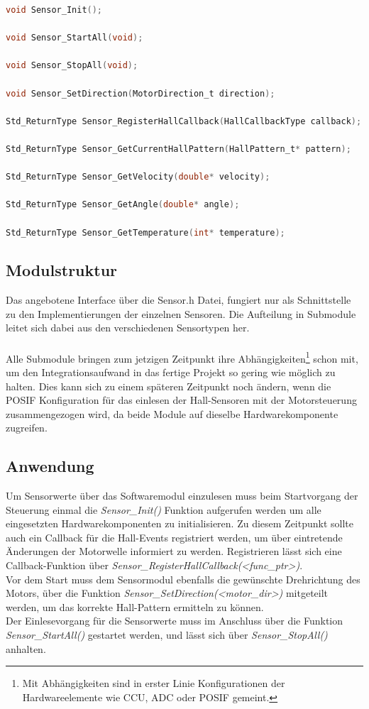 \begin{lstlisting}[frame=single, language=c, caption=Sensor Interface, label=lst:SensorInterface]
void Sensor_Init();

void Sensor_StartAll(void);

void Sensor_StopAll(void);

void Sensor_SetDirection(MotorDirection_t direction);

Std_ReturnType Sensor_RegisterHallCallback(HallCallbackType callback);

Std_ReturnType Sensor_GetCurrentHallPattern(HallPattern_t* pattern);

Std_ReturnType Sensor_GetVelocity(double* velocity);

Std_ReturnType Sensor_GetAngle(double* angle);

Std_ReturnType Sensor_GetTemperature(int* temperature);
\end{lstlisting}

\subsection{Modulstruktur}
Das angebotene Interface über die Sensor.h Datei, fungiert nur als Schnittstelle zu den Implementierungen der einzelnen Sensoren. Die Aufteilung in Submodule leitet sich dabei aus den verschiedenen Sensortypen her. \\
\noindent \\
Alle Submodule bringen zum jetzigen Zeitpunkt ihre Abhängigkeiten\footnote{Mit Abhängigkeiten sind in erster Linie Konfigurationen der Hardwareelemente wie CCU, ADC oder POSIF gemeint.} schon mit, um den Integrationsaufwand in das fertige Projekt so gering wie möglich zu halten. Dies kann sich zu einem späteren Zeitpunkt noch ändern, wenn die POSIF Konfiguration für das einlesen der Hall-Sensoren mit der Motorsteuerung zusammengezogen wird, da beide Module auf dieselbe Hardwarekomponente zugreifen.

\subsection{Anwendung}
Um Sensorwerte über das Softwaremodul einzulesen muss beim Startvorgang der Steuerung einmal die \textit{Sensor\_Init()} Funktion aufgerufen werden um alle eingesetzten Hardwarekomponenten zu initialisieren. Zu diesem Zeitpunkt sollte auch ein Callback für die Hall-Events registriert werden, um über eintretende Änderungen der Motorwelle informiert zu werden. Registrieren lässt sich eine Callback-Funktion über \textit{Sensor\_RegisterHallCallback(<func\_ptr>)}. \\
Vor dem Start muss dem Sensormodul ebenfalls die gewünschte Drehrichtung des Motors, über die Funktion \textit{Sensor\_SetDirection(<motor\_dir>)} mitgeteilt werden, um das korrekte Hall-Pattern ermitteln zu können. \\
Der Einlesevorgang für die Sensorwerte muss im Anschluss über die Funktion \textit{Sensor\_StartAll()} gestartet werden, und lässt sich über \textit{Sensor\_StopAll()} anhalten. \\

